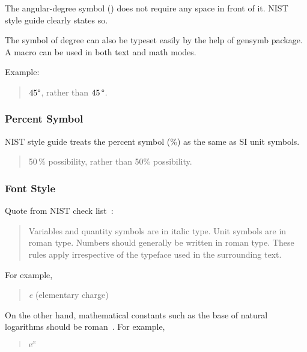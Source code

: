 The angular-degree symbol (\degree) does not require any space in front
of it.
NIST style guide clearly states so.

The symbol of degree can also be typeset easily by the help of gensymb
package.
A macro \qco{\\degree} can be used in both text and math modes.

Example:

\begin{quote}
  $45\degree$, rather than $45\,\degree$.
\end{quote}

\subsubsection{Percent Symbol}
\label{sec:app:styleguide:Percent Symbol}

NIST style guide treats the percent symbol (\%) as the same as SI unit
symbols.

\begin{quote}
  50\,\% possibility, rather than 50\% possibility.
\end{quote}

\subsubsection{Font Style}
\label{sec:app:styleguide:Font Style}

Quote from NIST check list~\cite[\#6]{NIST:UnitCheckList}:

\begin{quote}
  Variables and quantity symbols are in italic type.
  Unit symbols are in roman type.
  Numbers should generally be written in roman type.
  These rules apply irrespective of the typeface used in the surrounding
  text.
\end{quote}

For example,
\begin{quote}
  {\textit e} (elementary charge)
\end{quote}

On the other hand, mathematical constants such as the base
of natural logarithms should be roman~\cite{NIST:TypeFaces}.
For example,

\begin{quote}
  $\mathrm{e}^x$
\end{quote}


